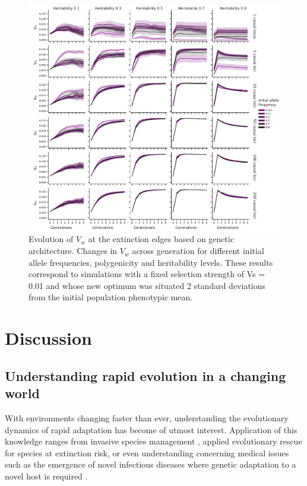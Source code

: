 \documentclass{article}
\begin{document}
\begin{figure}[H]
  \centering
  \includegraphics[width=1\textwidth]{figures/var_fitness_across_gen.pdf}
  \caption{Evolution of $V_w$ at the extinction edges based on genetic architecture. Changes in $V_w$ across generation for different initial allele frequencies, polygenicity and heritability levels. These results correspond to simulations with a fixed selection strength of Vs = 0.01 and whose new optimum was situated 2 standard deviations from the initial population phenotypic mean.}
  \label{fig:var_fitness_across_gen}
\end{figure}

\section{Discussion}
\subsection{Understanding rapid evolution in a changing world}
With environments changing faster than ever, understanding the evolutionary dynamics of rapid adaptation has become of utmost interest. Application of this knowledge ranges from invasive species management \citep{Lee2002-jg, Lee2008-cd}, applied evolutionary rescue for species at extinction risk, or even understanding concerning medical issues such as the emergence of novel infectious diseases where genetic adaptation to a novel host is required \citep{Holt2002-fn, Antia2003-in}.
\end{document}
